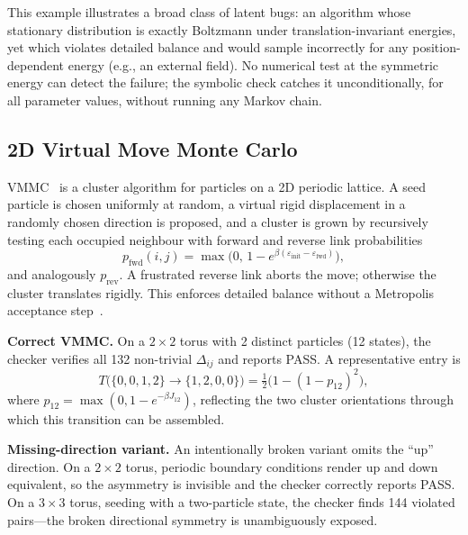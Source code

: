 \documentclass[twocolumn,10pt]{article}
\begin{document}
This example illustrates a broad class of latent bugs: an algorithm whose
stationary distribution is exactly Boltzmann under translation-invariant
energies, yet which violates detailed balance and would sample incorrectly
for any position-dependent energy (e.g., an external field).  No numerical
test at the symmetric energy can detect the failure; the symbolic check
catches it unconditionally, for all parameter values, without running any
Markov chain.

\subsection{2D Virtual Move Monte Carlo}
\label{sec:vmmc}

VMMC~\cite{Whitelam2007} is a cluster algorithm for particles on a 2D
periodic lattice.  A seed particle is chosen uniformly at random, a virtual
rigid displacement in a randomly chosen direction is proposed, and a cluster
is grown by recursively testing each occupied neighbour with forward and
reverse link probabilities
\begin{equation}
  p_\mathrm{fwd}(i,j) = \max\!\bigl(0,\,1-e^{\beta(\varepsilon_\mathrm{init}-\varepsilon_\mathrm{fwd})}\bigr),
\label{eq:plink}
\end{equation}
and analogously $p_\mathrm{rev}$.  A frustrated reverse link aborts the
move; otherwise the cluster translates rigidly.  This enforces detailed
balance without a Metropolis acceptance step~\cite{Whitelam2007}.

\smallskip\noindent\textbf{Correct VMMC.}
On a $2\times2$ torus with 2 distinct particles (12 states), the checker
verifies all 132 non-trivial $\Delta_{ij}$ and reports PASS.  A
representative entry is
\begin{equation}
  T\!\bigl(\{0,0,1,2\}\to\{1,2,0,0\}\bigr) = \tfrac12\bigl(1-(1-p_{12})^2\bigr),
\end{equation}
where $p_{12}=\max(0,1-e^{-\beta J_{12}})$, reflecting the two cluster
orientations through which this transition can be assembled.

\smallskip\noindent\textbf{Missing-direction variant.}
An intentionally broken variant omits the ``up'' direction.  On a $2\times2$
torus, periodic boundary conditions render up and down equivalent, so the
asymmetry is invisible and the checker correctly reports PASS.  On a
$3\times3$ torus, seeding with a two-particle state, the checker finds 144
violated pairs---the broken directional symmetry is unambiguously exposed.
\end{document}
